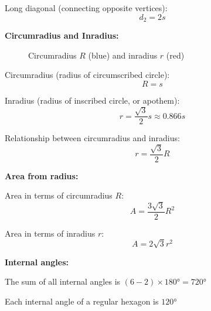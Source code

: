 Long diagonal (connecting opposite vertices):
\[
    d_2 = 2s
\]

\textbf{Circumradius and Inradius:}

\begin{figure}[H]
    \centering
    \caption{Circumradius $R$ (blue) and inradius $r$ (red)}
\end{figure}

Circumradius (radius of circumscribed circle):
\[
    R = s
\]

Inradius (radius of inscribed circle, or apothem):
\[
    r = \frac{\sqrt{3}}{2}s \approx 0.866s
\]

Relationship between circumradius and inradius:
\[
    r = \frac{\sqrt{3}}{2}R
\]

\textbf{Area from radius:}

Area in terms of circumradius $R$:
\[
    A = \frac{3\sqrt{3}}{2}R^2
\]

Area in terms of inradius $r$:
\[
    A = 2\sqrt{3}r^2
\]

\textbf{Internal angles:}

The sum of all internal angles is $(6-2) \times 180° = 720°$

Each internal angle of a regular hexagon is $120°$
